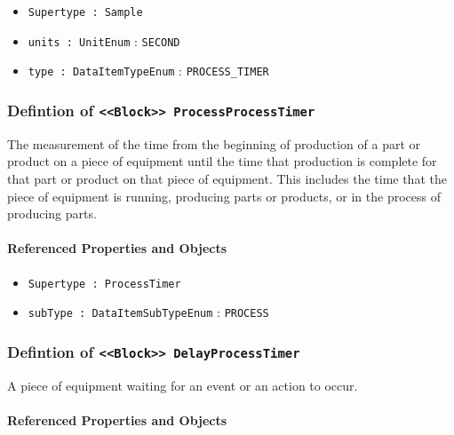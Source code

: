 \begin{itemize}
\item \texttt{Supertype : Sample}

\item \texttt{units : UnitEnum} : \texttt{SECOND}

\item \texttt{type : DataItemTypeEnum} : \texttt{PROCESS_TIMER}

\end{itemize}
\FloatBarrier
\subsubsection{Defintion of \texttt{<<Block>> ProcessProcessTimer}}
  \label{type:ProcessProcessTimer}

\FloatBarrier

The measurement of the time from the beginning of production of a part or product on a piece of equipment until the time that production is complete for that part or product on that piece of equipment.  This includes the time that the piece of equipment is running, producing parts or products, or in the process of producing parts.

\FloatBarrier
\paragraph{Referenced Properties and Objects}

\begin{itemize}
\item \texttt{Supertype : ProcessTimer}

\item \texttt{subType : DataItemSubTypeEnum} : \texttt{PROCESS}

\end{itemize}
\FloatBarrier
\subsubsection{Defintion of \texttt{<<Block>> DelayProcessTimer}}
  \label{type:DelayProcessTimer}

\FloatBarrier

A piece of equipment waiting for an event or an action to occur.

\FloatBarrier
\paragraph{Referenced Properties and Objects}

